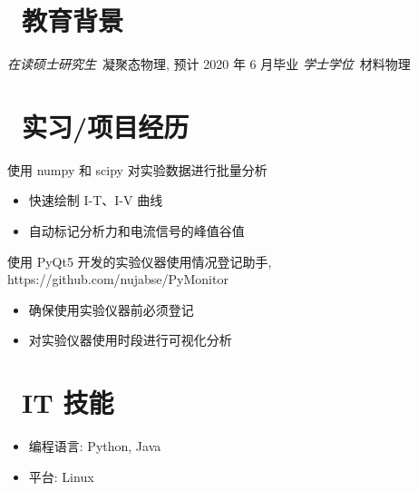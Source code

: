 \documentclass{resume}
\begin{document}


 
\section{\faGraduationCap\  教育背景}
\textit{在读硕士研究生}\ 凝聚态物理, 预计 2020 年 6 月毕业
\textit{学士学位}\ 材料物理

\section{\faUsers\ 实习/项目经历}

\begin{onehalfspacing}
  使用 numpy 和 scipy 对实验数据进行批量分析 
  \begin{itemize}
    \item 快速绘制 I-T、I-V 曲线
    \item 自动标记分析力和电流信号的峰值谷值
  \end{itemize}
\end{onehalfspacing}

\begin{onehalfspacing}
使用 PyQt5 开发的实验仪器使用情况登记助手, https://github.com/nujabse/PyMonitor
\begin{itemize}
  \item 确保使用实验仪器前必须登记
  \item 对实验仪器使用时段进行可视化分析
\end{itemize}
\end{onehalfspacing}



\section{\faCogs\ IT 技能}
\begin{itemize}[parsep=0.5ex]
  \item 编程语言: Python, Java
  \item 平台: Linux
\end{itemize}
\end{document}
